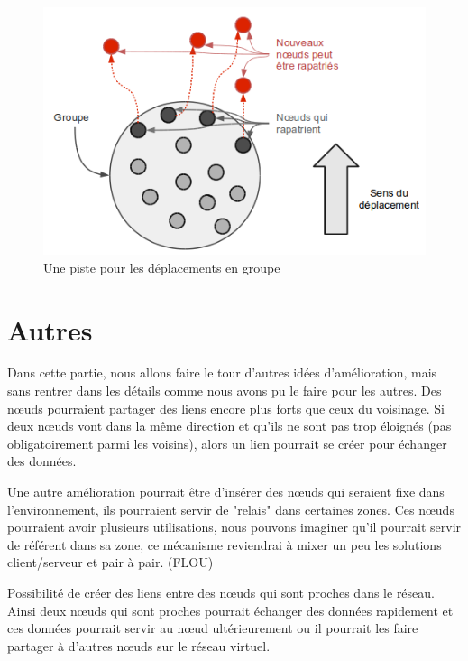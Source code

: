 \documentclass[11pt,a4paper]{article}
\begin{document}
	\vspace{1cm}
        \begin{figure}[!h]
        \centering
        \includegraphics[scale=0.65]{./images/mouvgroup.png}
        \caption{Une piste pour les déplacements en groupe}
        \label{mouvgroup}
        \end{figure}

\newpage
\section{Autres}
Dans cette partie, nous allons faire le tour d'autres idées d'amélioration, mais sans rentrer dans les détails comme nous avons pu le faire pour les autres. Des nœuds pourraient partager des liens encore plus forts que ceux du voisinage. Si deux nœuds vont dans la même direction et qu'ils ne sont pas trop éloignés (pas obligatoirement parmi les voisins), alors un lien pourrait se créer pour échanger des données.

\par Une autre amélioration pourrait être d'insérer des nœuds qui seraient fixe dans l'environnement, ils pourraient servir de "relais" dans certaines zones. Ces nœuds pourraient avoir plusieurs utilisations, nous pouvons imaginer qu'il pourrait servir de référent dans sa zone, ce mécanisme reviendrai à mixer un peu les solutions client/serveur et pair à pair. (FLOU)

\par Possibilité de créer des liens entre des nœuds qui sont proches dans le réseau. Ainsi deux nœuds qui sont proches pourrait échanger des données rapidement et ces données pourrait servir au nœud ultérieurement ou il pourrait les faire partager à d'autres nœuds sur le réseau virtuel. 
 
\end{document}
